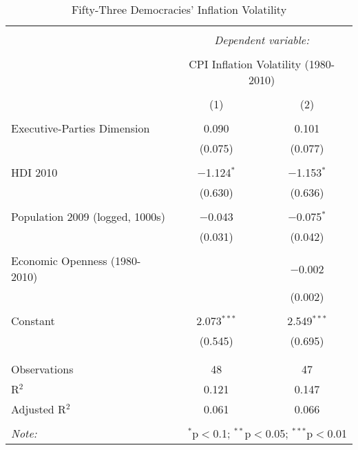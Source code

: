 \documentclass[11pt, oneside]{article}   	%
\begin{document}
\begin{table}[!htbp] \centering
  \caption{Fifty-Three Democracies' Inflation Volatility} 
  \label{} 
\small 
\begin{tabular}{@{\extracolsep{-15pt}}lcc} 
\\[-1.8ex]\hline 
\hline \\[-1.8ex] 
 & \multicolumn{2}{c}{\textit{Dependent variable:}} \\ 
\cline{2-3} 
\\[-1.8ex] & \multicolumn{2}{c}{CPI Inflation Volatility (1980-2010)} \\ 
\\[-1.8ex] & (1) & (2)\\ 
\hline \\[-1.8ex] 
 Executive-Parties Dimension & 0.090 & 0.101 \\ 
  & (0.075) & (0.077) \\ 
  & & \\ 
 HDI 2010 & $-$1.124$^{*}$ & $-$1.153$^{*}$ \\ 
  & (0.630) & (0.636) \\ 
  & & \\ 
 Population 2009 (logged, 1000s) & $-$0.043 & $-$0.075$^{*}$ \\ 
  & (0.031) & (0.042) \\ 
  & & \\ 
 Economic Openness (1980-2010) &  & $-$0.002 \\ 
  &  & (0.002) \\ 
  & & \\ 
 Constant & 2.073$^{***}$ & 2.549$^{***}$ \\ 
  & (0.545) & (0.695) \\ 
  & & \\ 
\hline \\[-1.8ex] 
Observations & 48 & 47 \\ 
R$^{2}$ & 0.121 & 0.147 \\ 
Adjusted R$^{2}$ & 0.061 & 0.066 \\ 
\hline 
\hline \\[-1.8ex] 
\textit{Note:}  & \multicolumn{2}{r}{$^{*}$p$<$0.1; $^{**}$p$<$0.05; $^{***}$p$<$0.01} \\ 
\end{tabular} 
\end{table} 
\end{document}
